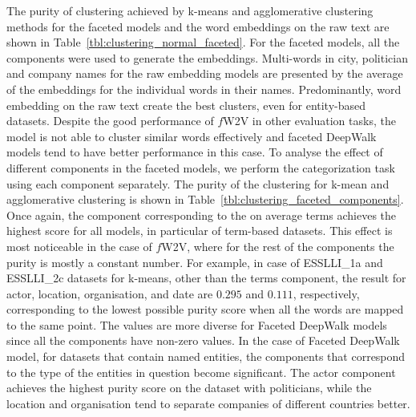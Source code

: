 The purity of clustering achieved by k-means and agglomerative clustering methods for the faceted models and the word embeddings on the raw text are shown in Table~\ref{tbl:clustering_normal_faceted}. For the faceted models, all the components were used to generate the embeddings. Multi-words in city, politician and company names for the raw embedding models are presented by the average of the embeddings for the individual words in their names. Predominantly, word embedding on the raw text create the best clusters, even for entity-based datasets. Despite the good performance of $f$W2V in other evaluation tasks, the model is not able to cluster similar words effectively and faceted DeepWalk models tend to have better performance in this case. To analyse the effect of different components in the faceted models, we perform the categorization task using each component separately. The purity of the clustering for k-mean and agglomerative clustering is shown in Table~\ref{tbl:clustering_faceted_components}. Once again, the component corresponding to the on average terms achieves the highest score for all models, in particular of term-based datasets. This effect is most noticeable in the case of $f$W2V, where for the rest of the components the purity is mostly a constant number. For example, in case of ESSLLI\_1a and ESSLLI\_2c datasets for k-means, other than the terms component, the result for actor, location, organisation, and date are $0.295$ and $0.111$, respectively, corresponding to the lowest possible purity score when all the words are mapped to the same point. The values are more diverse for Faceted DeepWalk models since all the components have non-zero values. In the case of Faceted DeepWalk model, for datasets that contain named entities, the components that correspond to the type of the entities in question become significant. The actor component achieves the highest purity score on the dataset with politicians, while the location and organisation tend to separate companies of different countries better. 
